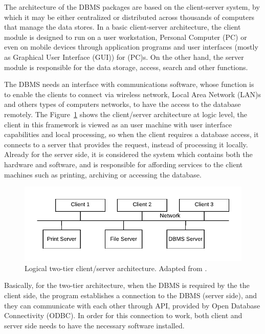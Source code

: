The architecture of the \gls{DBMS} packages are based on the client-server system, by which it may be either centralized or distributed across thousands of computers that manage the data stores. In a basic client-server architecture, the client module is designed to run on a user workstation, Personal Computer (PC) or even on mobile devices through application programs and user interfaces (mostly as Graphical User Interface (GUI)) for (PC)s. On the other hand, the server module is responsible for the data storage, access, search and other functions.

The \gls{DBMS} needs an interface with communications software, whose function is to enable the clients to connect via wireless network, Local Area Network (LAN)s and others types of computers networks, to have the access to the database remotely. The Figure~\ref{fig:2tierClientServer} shows the client/server architecture at logic level, the client in this framework is viewed as an user machine with user interface capabilities and local processing, so when the client requires a database access, it connects to a server that provides the request, instead of processing it locally. Already for the server side, it is considered the system which contains both the hardware and software, and is responsible for affording services to the client machines such as printing, archiving or accessing the database. 

\begin{figure}[h!]
    \centering
    \includegraphics{images/study_of_tools/database/TwoTierClientServer.pdf}
    \caption{Logical two-tier client/server architecture. Adapted from \cite{ELMASRI:2015}.}
    \label{fig:2tierClientServer}
\end{figure}

Basically, for the two-tier architecture, when the \gls{DBMS} is required by the the client side, the program establishes a connection to the \gls{DBMS} (server side), and they can communicate with each other through \gls{API}, provided by Open Database Connectivity (ODBC). In order for this connection to work, both client and server side needs to have the necessary software installed. 

